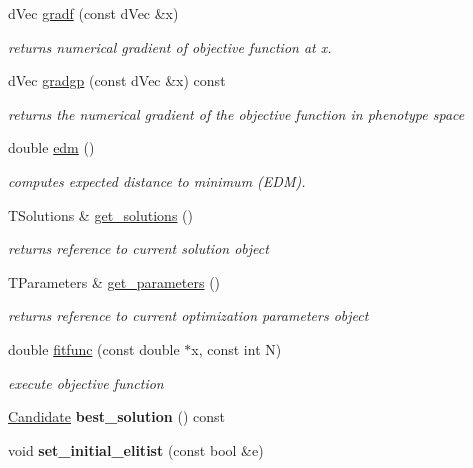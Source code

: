 \begin{DoxyCompactItemize}
d\-Vec \hyperlink{classlibcmaes_1_1ESOStrategy_a43bd0b30c43445bc4ee2257963eebf47}{gradf} (const d\-Vec \&x)
\begin{DoxyCompactList}\small\item\em returns numerical gradient of objective function at x. \end{DoxyCompactList}\item 
d\-Vec \hyperlink{classlibcmaes_1_1ESOStrategy_a8a0581ead7ca7fac1f414c92ed030317}{gradgp} (const d\-Vec \&x) const 
\begin{DoxyCompactList}\small\item\em returns the numerical gradient of the objective function in phenotype space \end{DoxyCompactList}\item 
double \hyperlink{classlibcmaes_1_1ESOStrategy_a6350c635353e7b54e78abb223a5d4029}{edm} ()
\begin{DoxyCompactList}\small\item\em computes expected distance to minimum (E\-D\-M). \end{DoxyCompactList}\item 
T\-Solutions \& \hyperlink{classlibcmaes_1_1ESOStrategy_a0efc59c0fb25005207381cd3c45cb778}{get\-\_\-solutions} ()
\begin{DoxyCompactList}\small\item\em returns reference to current solution object \end{DoxyCompactList}\item 
T\-Parameters \& \hyperlink{classlibcmaes_1_1ESOStrategy_a6941ee6debca9ce43fb56eea7206ea33}{get\-\_\-parameters} ()
\begin{DoxyCompactList}\small\item\em returns reference to current optimization parameters object \end{DoxyCompactList}\item 
double \hyperlink{classlibcmaes_1_1ESOStrategy_a2763e44feed5c7635338fedaecb83e23}{fitfunc} (const double $\ast$x, const int N)
\begin{DoxyCompactList}\small\item\em execute objective function \end{DoxyCompactList}\item 
\hypertarget{classlibcmaes_1_1ESOStrategy_a81441905608aba3daa6d60a78eb47763}{\hyperlink{classlibcmaes_1_1Candidate}{Candidate} {\bfseries best\-\_\-solution} () const }\label{classlibcmaes_1_1ESOStrategy_a81441905608aba3daa6d60a78eb47763}

\item 
\hypertarget{classlibcmaes_1_1ESOStrategy_a059cdb2676a9e9933ac8b9dad32a1938}{void {\bfseries set\-\_\-initial\-\_\-elitist} (const bool \&e)}\label{classlibcmaes_1_1ESOStrategy_a059cdb2676a9e9933ac8b9dad32a1938}

\end{DoxyCompactItemize}
